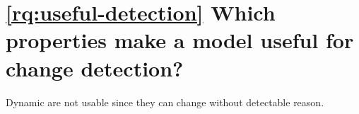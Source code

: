 \section{\ref{rq:useful-detection} Which properties make a model useful for change detection?}

Dynamic are not usable since they can change without detectable reason. \cite{mulders2022Statemodel}